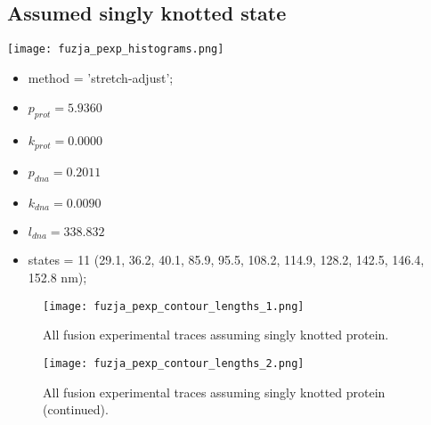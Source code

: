 \subsection{Assumed singly knotted state}
\label{subsec:fit-details-fusion-experiment-singly}
\begin{minipage}[c]{0.7\textwidth}
    \texttt{[image: fuzja\_pexp\_histograms.png]}
\end{minipage}
\hfill
\begin{minipage}[c]{0.45\textwidth}
    \begin{itemize}
        \item method = 'stretch-adjust';
        \item $p_{prot}=5.9360$
        \item $k_{prot}=0.0000$
        \item $p_{dna}=0.2011$
        \item $k_{dna}=0.0090$
        \item $l_{dna}=338.832$
        \item states = 11 (29.1, 36.2, 40.1, 85.9, 95.5, 108.2, 114.9, 128.2, 142.5, 146.4, 152.8 nm);
    \end{itemize}
\end{minipage}

\begin{figure}
    \centering
    \texttt{[image: fuzja\_pexp\_contour\_lengths\_1.png]}
    \caption{All fusion experimental traces assuming singly knotted protein.}
    \label{fig:unknotted-fusion-pexp-cl1}
\end{figure}

\begin{figure}
    \centering
    \texttt{[image: fuzja\_pexp\_contour\_lengths\_2.png]}
    \caption{All fusion experimental traces assuming singly knotted protein (continued).}
    \label{fig:unknotted-fusion-pexp-cl2}
\end{figure}

